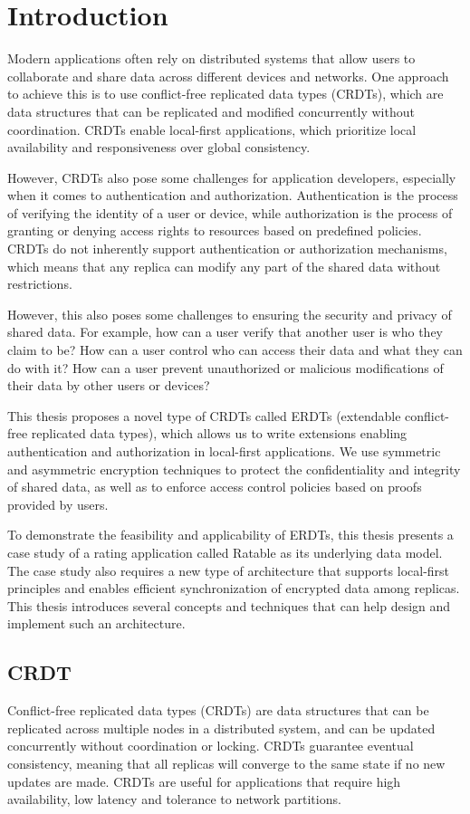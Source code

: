 \documentclass[
	ngerman,
	ruledheaders=section,   %
	class=report,		    %
	thesis={type=bachelor}, %
	accentcolor=9c,			%
	custommargins=true,    %
	marginpar=false,        %
	parskip=half-,          %
	fontsize=11pt,          %
]{tudapub}
\begin{document}
\chapter{Introduction}
Modern applications often rely on distributed systems that allow users to collaborate and share data across different devices and networks. One approach to achieve this is to use conflict-free replicated data types (CRDTs), which are data structures that can be replicated and modified concurrently without coordination. CRDTs enable local-first applications, which prioritize local availability and responsiveness over global consistency.

However, CRDTs also pose some challenges for application developers, especially when it comes to authentication and authorization. Authentication is the process of verifying the identity of a user or device, while authorization is the process of granting or denying access rights to resources based on predefined policies. CRDTs do not inherently support authentication or authorization mechanisms, which means that any replica can modify any part of the shared data without restrictions.

However, this also poses some challenges to ensuring the security and privacy of shared data. For example, how can a user verify that another user is who they claim to be? How can a user control who can access their data and what they can do with it? How can a user prevent unauthorized or malicious modifications of their data by other users or devices?

This thesis proposes a novel type of CRDTs called ERDTs (extendable conflict-free replicated data types), which allows us to write extensions enabling authentication and authorization in local-first applications. We use symmetric and asymmetric encryption techniques to protect the confidentiality and integrity of shared data, as well as to enforce access control policies based on proofs provided by users. 

To demonstrate the feasibility and applicability of ERDTs, this thesis presents a case study of a rating application called Ratable as its underlying data model. The case study also requires a new type of architecture that supports local-first principles and enables efficient synchronization of encrypted data among replicas. This thesis introduces several concepts and techniques that can help design and implement such an architecture.

\section{CRDT}
Conflict-free replicated data types (CRDTs) are data structures that can be replicated across multiple nodes in a distributed system, and can be updated concurrently without coordination or locking. CRDTs guarantee eventual consistency, meaning that all replicas will converge to the same state if no new updates are made. CRDTs are useful for applications that require high availability, low latency and tolerance to network partitions.
\end{document}
